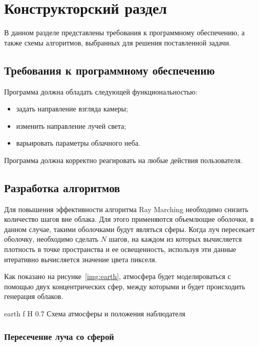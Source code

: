 \chapter{Конструкторский раздел}

В данном разделе представлены требования к программному обеспечению, а также схемы алгоритмов, выбранных для решения поставленной
задачи.

\section{Требования к программному обеспечению}
Программа должна обладать следующей функциональностью:
\begin{itemize}
	\item задать направление взгляда камеры;
	\item изменить направление лучей света;
	\item варьировать параметры облачного неба.
\end{itemize}

Программа должна корректно реагировать на любые действия пользователя.

\section{Разработка алгоритмов}

Для повышения эффективности алгоритма Ray Marching необходимо снизить количество шагов вне облака. 
Для этого применяются объемлющие оболочки, в данном случае, такими оболочками будут являться сферы.
Когда луч пересекает оболочку, необходимо сделать $ N $ шагов, на каждом из которых вычисляется плотность в точке пространства и ее освещенность, используя эти данные итеративно вычисляется значение цвета пикселя. 

Как показано на рисунке~\ref{img:earth}, атмосфера будет моделироваться с помощью двух концентрических сфер, между которыми и будет происходить генерация облаков.

{earth} %
{f} %
{H} %
{0.7\textwidth} %
{Схема атмосферы и положения наблюдателя} %


\subsection{Пересечение луча со сферой}


